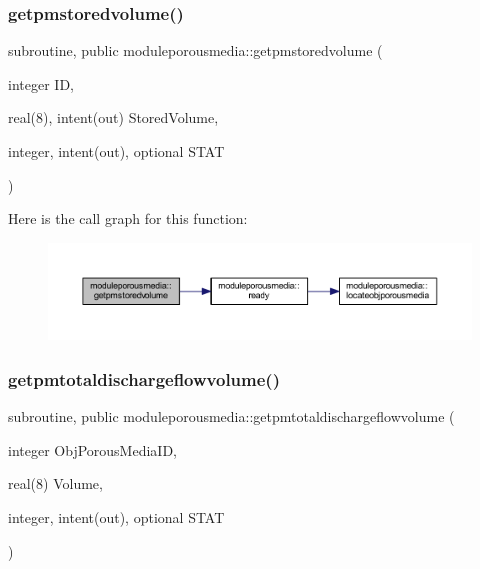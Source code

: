 \subsubsection{\texorpdfstring{getpmstoredvolume()}{getpmstoredvolume()}}
{\footnotesize\ttfamily subroutine, public moduleporousmedia\+::getpmstoredvolume (\begin{DoxyParamCaption}\item[{integer}]{ID,  }\item[{real(8), intent(out)}]{Stored\+Volume,  }\item[{integer, intent(out), optional}]{S\+T\+AT }\end{DoxyParamCaption})}

Here is the call graph for this function\+:\nopagebreak
\begin{figure}[H]
\begin{center}
\leavevmode
\includegraphics[width=350pt]{namespacemoduleporousmedia_a92e48a5d06b01af62070aecdf43d84e8_cgraph}
\end{center}
\end{figure}
\mbox{\label{namespacemoduleporousmedia_a4ef35ba24ac6cd6fbf310e39c0892c80}} 
\subsubsection{\texorpdfstring{getpmtotaldischargeflowvolume()}{getpmtotaldischargeflowvolume()}}
{\footnotesize\ttfamily subroutine, public moduleporousmedia\+::getpmtotaldischargeflowvolume (\begin{DoxyParamCaption}\item[{integer}]{Obj\+Porous\+Media\+ID,  }\item[{real(8)}]{Volume,  }\item[{integer, intent(out), optional}]{S\+T\+AT }\end{DoxyParamCaption})}

